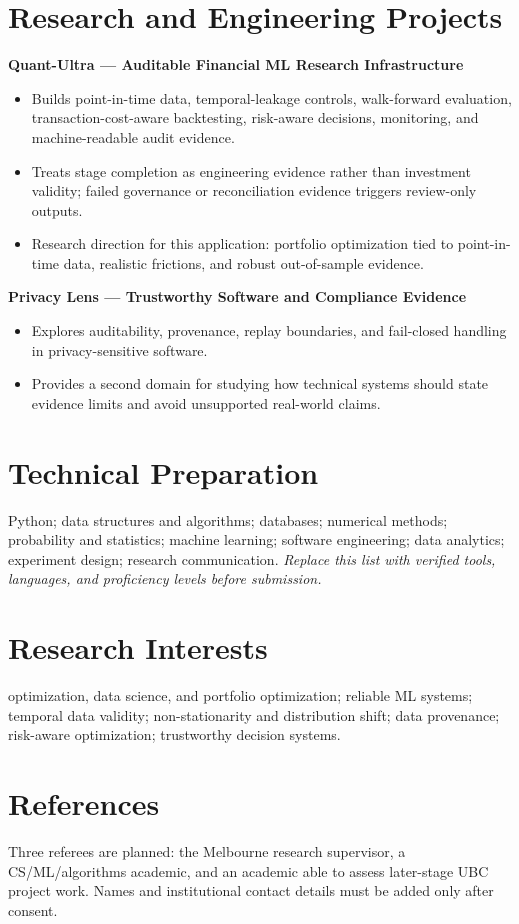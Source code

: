 \documentclass[11pt]{article}
\begin{document}
\section*{Research and Engineering Projects}
\textbf{Quant-Ultra --- Auditable Financial ML Research Infrastructure}
\begin{itemize}
\item Builds point-in-time data, temporal-leakage controls, walk-forward evaluation, transaction-cost-aware backtesting, risk-aware decisions, monitoring, and machine-readable audit evidence.
\item Treats stage completion as engineering evidence rather than investment validity; failed governance or reconciliation evidence triggers review-only outputs.
\item Research direction for this application: portfolio optimization tied to point-in-time data, realistic frictions, and robust out-of-sample evidence.
\end{itemize}

\begin{samepage}
\textbf{Privacy Lens --- Trustworthy Software and Compliance Evidence}
\begin{itemize}
\item Explores auditability, provenance, replay boundaries, and fail-closed handling in privacy-sensitive software.
\item Provides a second domain for studying how technical systems should state evidence limits and avoid unsupported real-world claims.
\end{itemize}
\end{samepage}

\section*{Technical Preparation}
Python; data structures and algorithms; databases; numerical methods; probability and statistics; machine learning; software engineering; data analytics; experiment design; research communication. \textit{Replace this list with verified tools, languages, and proficiency levels before submission.}

\section*{Research Interests}
optimization, data science, and portfolio optimization; reliable ML systems; temporal data validity; non-stationarity and distribution shift; data provenance; risk-aware optimization; trustworthy decision systems.

\section*{References}
Three referees are planned: the Melbourne research supervisor, a CS/ML/algorithms academic, and an academic able to assess later-stage UBC project work. Names and institutional contact details must be added only after consent.
\end{document}
